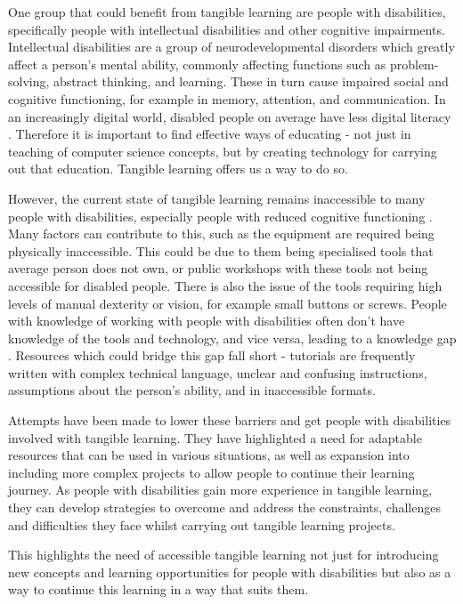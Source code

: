 \documentclass{l4proj}
\begin{document}
One group that could benefit from tangible learning are people with disabilities, specifically people with intellectual disabilities and other cognitive impairments. Intellectual disabilities are a group of neurodevelopmental disorders which greatly affect a person's mental ability, commonly affecting functions such as problem-solving, abstract thinking, and learning. These in turn cause impaired social and cognitive functioning, for example in memory, attention, and communication. \citep{Ame2013} 
In an increasingly digital world, disabled people on average have less digital literacy \citep{Llo2022}. Therefore it is important to find effective ways of educating - not just in teaching of computer science concepts, but by creating technology for carrying out that education. Tangible learning offers us a way to do so. 

However, the current state of tangible learning remains inaccessible to many people with disabilities, especially people with reduced cognitive functioning \citep{Seo2019}. Many factors can contribute to this, such as the equipment are required being physically inaccessible. This could be due to them being specialised tools that average person does not own, or public workshops with these tools not being accessible for disabled people. There is also the issue of the tools requiring high levels of manual dexterity or vision, for example small buttons or screws. People with knowledge of working with people with disabilities often don’t have knowledge of the tools and technology, and vice versa, leading to a knowledge gap \citep{Raj2015}. Resources which could bridge this gap fall short - tutorials are frequently written with complex technical language, unclear and confusing instructions, assumptions about the person's ability, and in inaccessible formats.

Attempts have been made to lower these barriers and get people with disabilities involved with tangible learning. They have highlighted a need for adaptable resources that can be used in various situations, as well as expansion into including more complex projects to allow people to continue their learning journey. As people with disabilities gain more experience in tangible learning, they can develop strategies to overcome and address the constraints, challenges and difficulties they face whilst carrying out tangible learning projects.

This highlights the need of accessible tangible learning not just for introducing new concepts and learning opportunities for people with disabilities but also as a way to continue this learning in a way that suits them.
\end{document}
